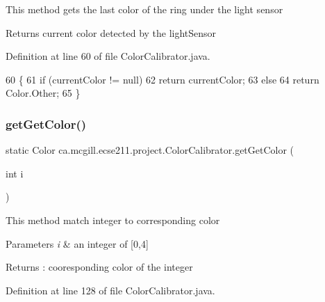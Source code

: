 This method gets the last color of the ring under the light sensor

\begin{DoxyReturn}{Returns}
current color detected by the light\+Sensor 
\end{DoxyReturn}


Definition at line 60 of file Color\+Calibrator.\+java.


\begin{DoxyCode}
60                                  \{
61     \textcolor{keywordflow}{if} (currentColor != null)
62       \textcolor{keywordflow}{return} currentColor;
63     \textcolor{keywordflow}{else}
64       \textcolor{keywordflow}{return} Color.Other;
65   \}
\end{DoxyCode}
\mbox{\label{classca_1_1mcgill_1_1ecse211_1_1project_1_1_color_calibrator_acb1d9cef0739971dbe00cc16712be0fe}} 
\subsubsection{\texorpdfstring{get\+Get\+Color()}{getGetColor()}}
{\footnotesize\ttfamily static Color ca.\+mcgill.\+ecse211.\+project.\+Color\+Calibrator.\+get\+Get\+Color (\begin{DoxyParamCaption}\item[{int}]{i }\end{DoxyParamCaption})\hspace{0.3cm}{\ttfamily [static]}}

This method match integer to corresponding color


\begin{DoxyParams}{Parameters}
{\em i} & an integer of \mbox{[}0,4\mbox{]} \\
\hline
\end{DoxyParams}
\begin{DoxyReturn}{Returns}
\+: cooresponding color of the integer 
\end{DoxyReturn}


Definition at line 128 of file Color\+Calibrator.\+java.



